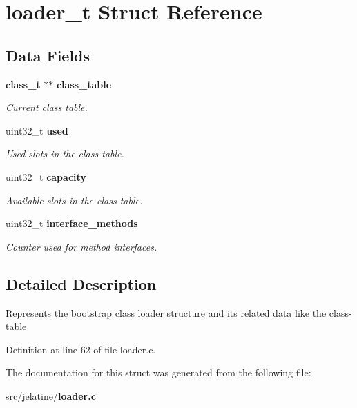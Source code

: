 \section{loader\_\-t Struct Reference}
\label{structloader__t}
\subsection*{Data Fields}
\begin{DoxyCompactItemize}
\item 
{\bf class\_\-t} $\ast$$\ast$ {\bf class\_\-table}\label{structloader__t_af93bcffab38603eb4238dded74db9d60}

\begin{DoxyCompactList}\small\item\em Current class table. \item\end{DoxyCompactList}\item 
uint32\_\-t {\bf used}\label{structloader__t_a9c65fe94fc714556e4e34d8546c42308}

\begin{DoxyCompactList}\small\item\em Used slots in the class table. \item\end{DoxyCompactList}\item 
uint32\_\-t {\bf capacity}\label{structloader__t_aea5af9d4721b4a9fb905799c3704308a}

\begin{DoxyCompactList}\small\item\em Available slots in the class table. \item\end{DoxyCompactList}\item 
uint32\_\-t {\bf interface\_\-methods}\label{structloader__t_ae481ec3fe3d6b3386b2356214ae2340d}

\begin{DoxyCompactList}\small\item\em Counter used for method interfaces. \item\end{DoxyCompactList}\end{DoxyCompactItemize}


\subsection{Detailed Description}
Represents the bootstrap class loader structure and its related data like the class-\/table 

Definition at line 62 of file loader.c.



The documentation for this struct was generated from the following file:\begin{DoxyCompactItemize}
\item 
src/jelatine/{\bf loader.c}\end{DoxyCompactItemize}
